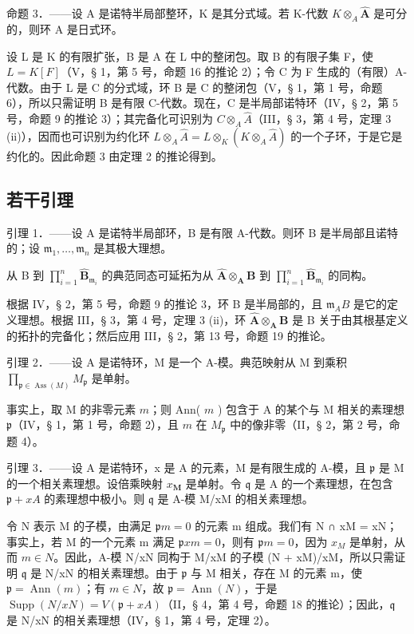 命题 3．——设 A 是诺特半局部整环，K 是其分式域。若 K-代数 \(K \otimes_{A} \hat{\mathbf{A}}\) 是可分的，则环 A 是日式环。

设 L 是 K 的有限扩张，B 是 A 在 L 中的整闭包。取 B 的有限子集 F，使 \(L = K[F]\)（V，§ 1，第 5 号，命题 16 的推论 2）；令 C 为 F 生成的（有限）A-代数。由于 L 是 C 的分式域，环 B 是 C 的整闭包（V，§ 1，第 1 号，命题 6），所以只需证明 B 是有限 C-代数。现在，C 是半局部诺特环（IV，§ 2，第 5 号，命题 9 的推论 3）；其完备化可识别为 \(C \otimes_{A} \hat{A}\)（III，§ 3，第 4 号，定理 3 (ii)），因而也可识别为约化环 \(L \otimes_{A} \hat{A} = L \otimes_{K} (K \otimes_{A} \hat{A})\) 的一个子环，于是它是约化的。因此命题 3 由定理 2 的推论得到。

\subsection{若干引理}

引理 1．——设 A 是诺特半局部环，B 是有限 A-代数。则环 B 是半局部且诺特的；设 \(\mathfrak{m}_1, \ldots, \mathfrak{m}_n\) 是其极大理想。

从 B 到 \(\prod_{i=1}^{n} \hat{\mathbf{B}}_{\mathfrak{m}_i}\) 的典范同态可延拓为从 \(\hat{\mathbf{A}} \otimes_{\mathbf{A}} \mathbf{B}\) 到 \(\prod_{i=1}^{n} \hat{\mathbf{B}}_{\mathfrak{m}_i}\) 的同构。

根据 IV，§ 2，第 5 号，命题 9 的推论 3，环 B 是半局部的，且 \(\mathfrak{m}_{A}B\) 是它的定义理想。根据 III，§ 3，第 4 号，定理 3 (ii)，环 \(\hat{\mathbf{A}} \otimes_{\mathbf{A}} \mathbf{B}\) 是 B 关于由其根基定义的拓扑的完备化；然后应用 III，§ 2，第 13 号，命题 19 的推论。

引理 2．——设 A 是诺特环，M 是一个 A-模。典范映射从 M 到乘积 \(\prod_{\mathfrak{p} \in \operatorname{Ass}(M)} M_{\mathfrak{p}}\) 是单射。

事实上，取 M 的非零元素 \(m\)；则 Ann( \(m\) ) 包含于 A 的某个与 M 相关的素理想 \(\mathfrak{p}\)（IV，§ 1，第 1 号，命题 2），且 \(m\) 在 \(M_{\mathfrak{p}}\) 中的像非零（II，§ 2，第 2 号，命题 4）。

引理 3．——设 A 是诺特环，x 是 A 的元素，M 是有限生成的 A-模，且 \(\mathfrak{p}\) 是 M 的一个相关素理想。设倍乘映射 \(x_{\mathbf{M}}\) 是单射。令 \(\mathfrak{q}\) 是 A 的一个素理想，在包含 \(\mathfrak{p} + xA\) 的素理想中极小。则 \(\mathfrak{q}\) 是 A-模 M/xM 的相关素理想。

令 N 表示 M 的子模，由满足 \(\mathfrak{p}m = 0\) 的元素 m 组成。我们有 N ∩ xM = xN；事实上，若 M 的一个元素 m 满足 \(\mathfrak{p}xm = 0\)，则有 \(\mathfrak{p}m = 0\)，因为 \(x_{M}\) 是单射，从而 \(m \in N\)。因此，A-模 N/xN 同构于 M/xM 的子模 (N + xM)/xM，所以只需证明 \(\mathfrak{q}\) 是 N/xN 的相关素理想。由于 \(\mathfrak{p}\) 与 M 相关，存在 M 的元素 m，使 \(\mathfrak{p} = \operatorname{Ann}(m)\)；有 \(m \in N\)，故 \(\mathfrak{p} = \operatorname{Ann}(N)\)，于是 \(\operatorname{Supp}(N/xN) = V(\mathfrak{p} + xA)\)（II，§ 4，第 4 号，命题 18 的推论）；因此，\(\mathfrak{q}\) 是 N/xN 的相关素理想（IV，§ 1，第 4 号，定理 2）。

